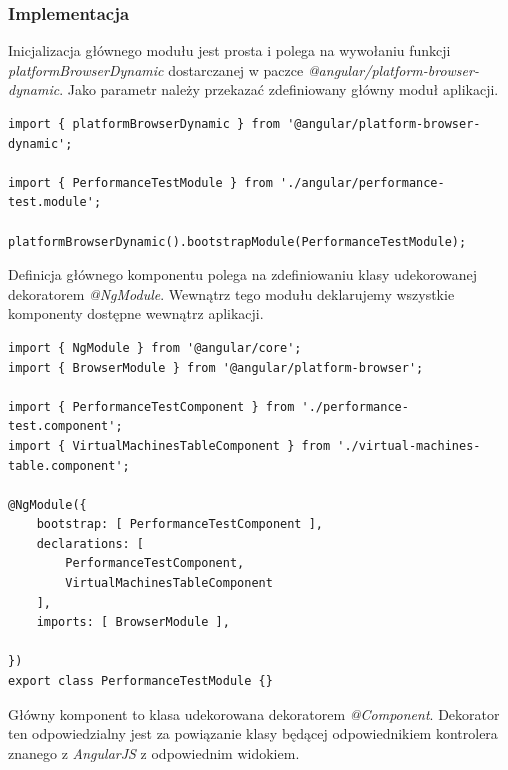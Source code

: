 \documentclass[polish, twoside, 12pt]{mwart}
\begin{document}
\subsubsection{Implementacja}

Inicjalizacja głównego modułu jest prosta i polega na wywołaniu funkcji \emph{platformBrowserDynamic} dostarczanej w paczce \emph{@angular/platform-browser-dynamic}. Jako parametr należy przekazać zdefiniowany główny moduł aplikacji.

\begin{lstlisting}[caption=Inicjalizacja głównego modułu]
import { platformBrowserDynamic } from '@angular/platform-browser-dynamic';

import { PerformanceTestModule } from './angular/performance-test.module';

platformBrowserDynamic().bootstrapModule(PerformanceTestModule);
\end{lstlisting}

Definicja głównego komponentu polega na zdefiniowaniu klasy udekorowanej dekoratorem \emph{@NgModule}. Wewnątrz tego modułu deklarujemy wszystkie komponenty dostępne wewnątrz aplikacji.

\begin{lstlisting}[caption=Główny moduł]
import { NgModule } from '@angular/core';
import { BrowserModule } from '@angular/platform-browser';

import { PerformanceTestComponent } from './performance-test.component';
import { VirtualMachinesTableComponent } from './virtual-machines-table.component';

@NgModule({
    bootstrap: [ PerformanceTestComponent ],
    declarations: [
        PerformanceTestComponent,
        VirtualMachinesTableComponent
    ],
    imports: [ BrowserModule ],

})
export class PerformanceTestModule {}
\end{lstlisting}

Główny komponent to klasa udekorowana dekoratorem \emph{@Component}. Dekorator ten odpowiedzialny jest za powiązanie klasy będącej odpowiednikiem kontrolera znanego z \emph{AngularJS} z odpowiednim widokiem.
\end{document}
